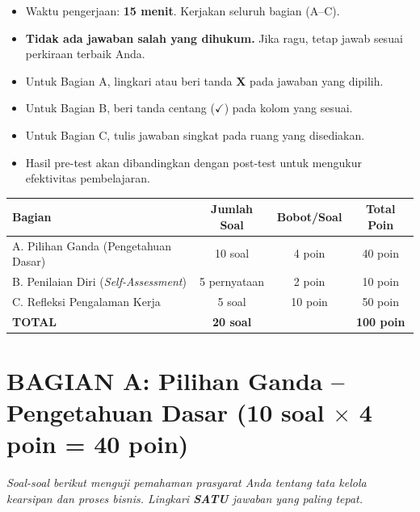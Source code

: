 \documentclass[12pt,a4paper]{report}
\begin{document}
\vspace{0.4cm}

\begin{warnbox}
\begin{itemize}[nosep]
    \item Waktu pengerjaan: \textbf{15 menit}. Kerjakan seluruh bagian (A--C).
    \item \textbf{Tidak ada jawaban salah yang dihukum.} Jika ragu, tetap jawab sesuai perkiraan terbaik Anda.
    \item Untuk Bagian A, lingkari atau beri tanda \textbf{X} pada jawaban yang dipilih.
    \item Untuk Bagian B, beri tanda centang ($\checkmark$) pada kolom yang sesuai.
    \item Untuk Bagian C, tulis jawaban singkat pada ruang yang disediakan.
    \item Hasil pre-test akan dibandingkan dengan post-test untuk mengukur efektivitas pembelajaran.
\end{itemize}
\end{warnbox}

\vspace{0.3cm}

\renewcommand{\arraystretch}{1.3}
\begin{center}
\small
\begin{tabularx}{0.85\textwidth}{@{} X c c c @{}}
\toprule
\textbf{Bagian} & \textbf{Jumlah Soal} & \textbf{Bobot/Soal} & \textbf{Total Poin} \\
\midrule
A. Pilihan Ganda (Pengetahuan Dasar) & 10 soal & 4 poin & 40 poin \\
B. Penilaian Diri (\textit{Self-Assessment}) & 5 pernyataan & 2 poin & 10 poin \\
C. Refleksi Pengalaman Kerja & 5 soal & 10 poin & 50 poin \\
\midrule
\textbf{TOTAL} & \textbf{20 soal} & & \textbf{100 poin} \\
\bottomrule
\end{tabularx}
\end{center}
\renewcommand{\arraystretch}{1.0}

\newpage
\section{BAGIAN A: Pilihan Ganda -- Pengetahuan Dasar (10 soal $\times$ 4 poin = 40 poin)}
\textit{Soal-soal berikut menguji pemahaman prasyarat Anda tentang tata kelola kearsipan dan proses bisnis. Lingkari \textbf{SATU} jawaban yang paling tepat.}
\end{document}
